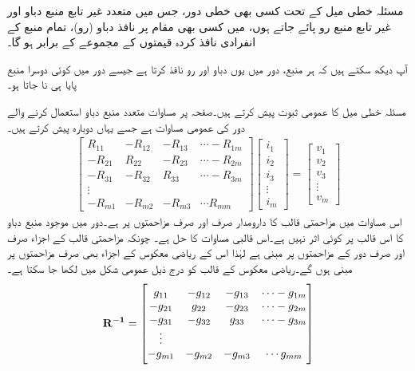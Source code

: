 مسئلہ خطی میل کے تحت کسی بھی خطی دور، جس میں متعدد غیر تابع منبع دباو اور غیر تابع منبع رو پائے جاتے ہوں، میں  کسی بھی مقام پر نافذ دباو (رو)، تمام منبع کے انفرادی نافذ کردہ قیمتوں  کے مجموعے  کے برابر ہو گا۔

آپ دیکھ سکتے ہیں کہ ہر منبع، دور میں یوں دباو اور رو نافذ کرتا ہے جیسے دور میں کوئی دوسرا منبع پایا ہی نا جاتا ہو۔

مسئلہ خطی میل کا عمومی ثبوت پیش کرتے ہیں۔صفحہ  پر مساوات  متعدد منبع دباو استعمال کرنے والے دور کی عمومی مساوات ہے جسے یہاں دوبارہ پیش کرتے ہیں۔
\begin{align}\label{مساوات_جوڑ_عمومی_مساوات_متعدد_منبع_دوبارہ}
\begin{bmatrix}
R_{11} & -R_{12}& -R_{13}& \cdots -R_{1m}\\
-R_{21} & R_{22}& -R_{23}& \cdots -R_{2m}\\
-R_{31} & -R_{32}& R_{33}& \cdots -R_{3m}\\
\vdots\\
-R_{m1}&-R_{m2}&-R_{m3}&\cdots R_{mm}
\end{bmatrix}
\begin{bmatrix}
i_1\\
i_2\\
i_3\\
\vdots\\
i_m
\end{bmatrix}
=
\begin{bmatrix}
v_{1}\\
v_{2}\\
v_{3}\\
\vdots\\
v_{m}
\end{bmatrix}
\end{align}
اس مساوات میں مزاحمتی قالب کا دارومدار صرف اور صرف مزاحمتوں پر ہے۔دور میں موجود منبع دباو کا اس قالب پر کوئی اثر نہیں ہے۔اس قالبی مساوات  کا حل  ہے۔ چونکہ مزاحمتی قالب  کے اجزاء صرف اور صرف دور کے مزاحمتوں پر مبنی ہے لہٰذا اس کے ریاضی معکوس  کے اجزاء بھی صرف مزاحمتوں پر مبنی ہوں گے۔ریاضی معکوس کے قالب کو درج ذیل عمومی شکل میں لکھا جا سکتا ہے۔
\begin{align*}
\bf{R^{-1}}=
\begin{bmatrix}
g_{11} & -g_{12}& -g_{13}& \cdots -g_{1m}\\
-g_{21} & g_{22}& -g_{23}& \cdots -g_{2m}\\
-g_{31} & -g_{32}& g_{33}& \cdots -g_{3m}\\
\vdots\\
-g_{m1}&-g_{m2}&-g_{m3}&\cdots g_{mm}
\end{bmatrix}
\end{align*}
